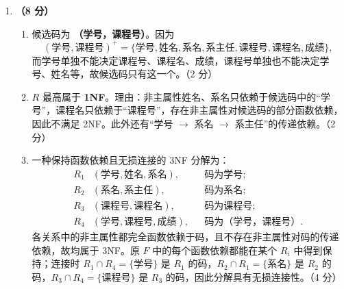 \documentclass[a4paper,11pt]{article}
\begin{document}
\begin{enumerate}[start=21, label=\textbf{\arabic*.}, leftmargin=2.4em, itemsep=0.45em]
\begin{enumerate}[label=（\arabic*）, leftmargin=2.2em, itemsep=2pt]
  \item 创建 SC 表：
\begin{lstlisting}[language=SQL]
CREATE TABLE SC (
    Sno   CHAR(9) NOT NULL,
    Cno   CHAR(4) NOT NULL,
    Grade DECIMAL(5,1),
    PRIMARY KEY (Sno, Cno),
    FOREIGN KEY (Sno) REFERENCES Student(Sno),
    FOREIGN KEY (Cno) REFERENCES Course(Cno),
    CHECK (Grade BETWEEN 0 AND 100)
);
\end{lstlisting}
数据类型可随 DBMS 调整；主码、两个外码和  约束是得分点。\hfill（2.5 分）
\end{enumerate}

\item \textbf{（8 分）}
\begin{enumerate}[label=（\arabic*）, leftmargin=2.2em, itemsep=2pt]
  \item 候选码为 \textbf{（学号，课程号）}。因为
  \[
  (\text{学号},\text{课程号})^{+}
  =\{\text{学号},\text{姓名},\text{系名},\text{系主任},\text{课程号},\text{课程名},\text{成绩}\},
  \]
  而学号单独不能决定课程号、课程名、成绩，课程号单独也不能决定学号、姓名等，故候选码只有这一个。\hfill（2 分）

  \item $R$ 最高属于 \textbf{1NF}。理由：非主属性姓名、系名只依赖于候选码中的“学号”，课程名只依赖于“课程号”，存在非主属性对候选码的部分函数依赖，因此不满足 2NF。此外还有“学号 $\to$ 系名 $\to$ 系主任”的传递依赖。\hfill（2 分）

  \item 一种保持函数依赖且无损连接的 3NF 分解为：
  \[
  \begin{aligned}
  R_1&(\text{学号},\text{姓名},\text{系名}), &&\text{码为学号};\\
  R_2&(\text{系名},\text{系主任}), &&\text{码为系名};\\
  R_3&(\text{课程号},\text{课程名}), &&\text{码为课程号};\\
  R_4&(\text{学号},\text{课程号},\text{成绩}), &&\text{码为（学号，课程号）}.
  \end{aligned}
  \]
  各关系中的非主属性都完全函数依赖于码，且不存在非主属性对码的传递依赖，故均属于 3NF。原 $F$ 中的每个函数依赖都能在某个 $R_i$ 中得到保持；连接时 $R_1\cap R_4=\{\text{学号}\}$ 是 $R_1$ 的码，$R_2\cap R_1=\{\text{系名}\}$ 是 $R_2$ 的码，$R_3\cap R_4=\{\text{课程号}\}$ 是 $R_3$ 的码，因此分解具有无损连接性。\hfill（4 分）
\end{enumerate}


\end{enumerate}
\end{document}
